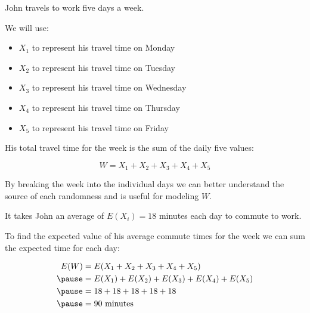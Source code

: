\documentclass{beamer}
\begin{document}
\begin{frame}
\begin{example}\label{john travels}
\vspace{-2mm}%
John travels to work five days a week.\pause

\vspace{1mm}
We will use:
\begin{itemize}
\item $X_1$ to represent his travel time on Monday
\item $X_2$ to represent his travel time on Tuesday
\item $X_3$ to represent his travel time on Wednesday
\item $X_4$ to represent his travel time on Thursday
\item $X_5$ to represent his travel time on Friday
\end{itemize}\pause
His total travel time for the week is the sum of the daily five values:

\vspace{-3mm}
\begin{equation*}
W = X_1+X_2+X_3+X_4+X_5
\end{equation*}
\end{example}\pause

\begin{note}
By breaking the week into the individual days we can better understand the source of each randomness and is useful for modeling $W$.
\end{note}
\end{frame}

\begin{frame}
\begin{example}
It takes John an average of $E(X_i)=18$ minutes each day to commute to work.\pause

\vspace{1mm}
To find the expected value of his average commute times for the week we can sum the expected time for each day:

\vspace{-2mm}
\begin{equation*}
\begin{aligned}
E(W) &= E(X_1+X_2+X_3+X_4+X_5) \\\pause
&= E(X_1)+E(X_2)+E(X_3)+E(X_4)+E(X_5) \\\pause
&= 18 + 18 + 18 + 18 + 18 \\\pause
&= 90~\text{minutes}
\end{aligned}
\end{equation*}\pause

\vspace{-1mm}
\pause
{}
\end{example}
\end{frame}
\end{document}

